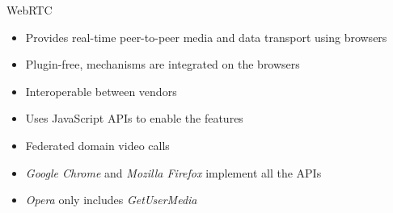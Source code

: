 \documentclass[first=red,second=purple,logo=yellowexc]{aaltoslides}
\begin{document}
\begin{frame}{WebRTC}

\begin{itemize}
\item Provides real-time peer-to-peer media and data transport using browsers
\item {\color{red}Plugin-free}, mechanisms are integrated on the browsers
\item Interoperable between vendors
\item Uses JavaScript APIs to enable the features
\item Federated domain video calls
\item {\it Google Chrome} and {\it Mozilla Firefox} implement all the APIs
\item {\it Opera} only includes {\it GetUserMedia}
\end{itemize}
\end{frame}


\end{document}
